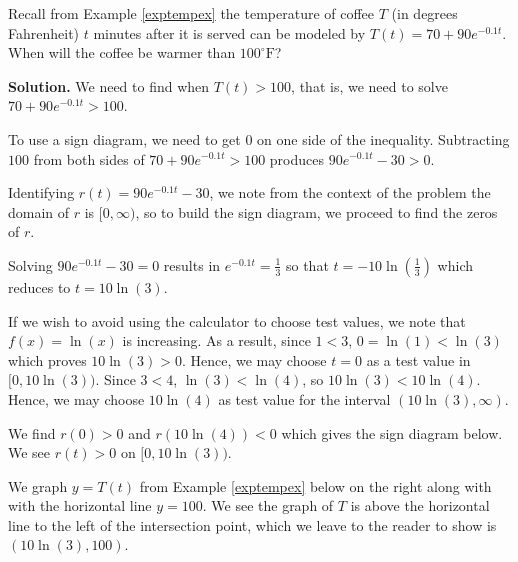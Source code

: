 \documentclass{ximera}
\begin{document}
\begin{ex}  \label{coffeewarmerex} Recall from Example \ref{exptempex}  the temperature of coffee $T$ (in degrees Fahrenheit) $t$ minutes after it is served can be modeled by $T(t) = 70 + 90 e^{-0.1 t}$.  When will the coffee be warmer than $100^{\circ}\mbox{F}$?

\smallskip

{\bf Solution.}  We need to find when $T(t) > 100$, that is, we need to solve  $70 + 90 e^{-0.1 t} > 100$.  

\smallskip

To use a sign diagram, we need to get $0$ on one side of the inequality.  Subtracting $100$ from both sides of $70 + 90 e^{-0.1 t} > 100$ produces   $90 e^{-0.1 t} - 30 > 0$. 

\smallskip

Identifying  $r(t) = 90 e^{-0.1 t} - 30$, we note from the context of the problem the domain of $r$ is $[0, \infty)$, so to build the sign diagram, we proceed to find the zeros of $r$.  

\smallskip

Solving $90 e^{-0.1 t} - 30=0$ results in $e^{-0.1t} = \frac{1}{3}$ so that $t = -10\ln\left(\frac{1}{3}\right)$  which reduces to $t = 10 \ln(3)$.

\smallskip

If we wish to avoid using the calculator to choose test values, we note that $f(x)  = \ln(x)$ is increasing.  As a result,  since $1 < 3$, $0 = \ln(1) < \ln(3)$ which proves $10\ln(3) > 0$. Hence, we may choose $t = 0$ as a test value in $[0, 10 \ln(3))$.  Since $3 < 4$, $\ln(3) < \ln(4)$, so $10 \ln(3) < 10 \ln(4)$. Hence,  we may choose $10 \ln(4)$   as test value for the interval $(10 \ln(3), \infty)$. 

\smallskip

We find $r(0)>0$ and $r(10\ln(4))<0$  which gives  the sign diagram below. We see $r(t)>0$ on $[0, 10\ln(3))$.

\smallskip

We graph $y=T(t)$ from Example  \ref{exptempex} below on the right along with with the horizontal line $y = 100$.   We see the graph of $T$ is above the horizontal line to the left of the intersection point, which we leave to the reader to show is $(10 \ln(3), 100)$.

\begin{center}

\begin{tabular}{m{0.5in}m{2.5in}m{2.5in}}


\end{tabular}
\end{center}
\end{ex}
\end{document}
